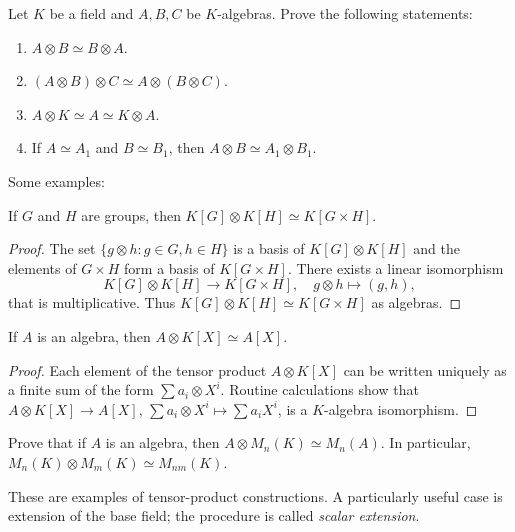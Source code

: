 \begin{exercise}
    Let $K$ be a field and $A,B,C$ be $K$-algebras. 
    Prove the following statements:
	\begin{enumerate}
		\item $A\otimes B\simeq B\otimes A$.
		\item $(A\otimes B)\otimes C\simeq A\otimes(B\otimes C)$.
		\item $A\otimes K\simeq A\simeq K\otimes A$.
		\item If $A\simeq A_1$ and $B\simeq B_1$, then $A\otimes B\simeq A_1\otimes B_1$.
	\end{enumerate}
\end{exercise}

Some examples:

\begin{proposition}
	If $G$ and $H$ are groups, then $K[G]\otimes K[H]\simeq K[G\times H]$.
\end{proposition}

\begin{proof}
	The set $\{g\otimes h:g\in G,h\in H\}$ is a basis of $K[G]\otimes K[H]$ and 
	the elements of $G\times H$ form a basis of $K[G\times H]$. There exists a linear isomorphism 
	\[
	K[G]\otimes K[H]\to K[G\times H], 
	\quad 
	g\otimes h\mapsto (g,h),
	\]
	that is multiplicative. Thus $K[G]\otimes K[H]\simeq K[G\times H]$
	as algebras. 
\end{proof}

\begin{proposition}
\label{pro:AKX=AX}
	If $A$ is an algebra, then $A\otimes K[X]\simeq A[X]$.	
\end{proposition}

\begin{proof}
	Each element of the tensor product $A\otimes K[X]$ can be written uniquely as a finite sum of
	the form $\sum a_i\otimes X^i$. Routine calculations show that 
	$A\otimes K[X]\to A[X]$, $\sum a_i\otimes X^i\mapsto \sum a_iX^i$, is a 
	$K$-algebra isomorphism. 
\end{proof}

\begin{exercise}
\label{xca:AM=MA}
	Prove that if $A$ is an algebra, then $A\otimes M_n(K)\simeq M_n(A)$. In
	particular, $M_n(K)\otimes M_m(K)\simeq M_{nm}(K)$.
\end{exercise}

These are examples of tensor-product constructions.
A particularly useful case is extension of the base field; the procedure is called 
\emph{scalar extension}. 

